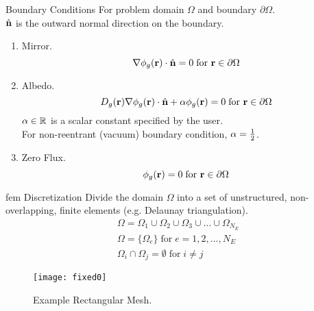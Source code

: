 \begin{frame}{Boundary Conditions}
  For problem domain $\Omega$ and boundary $\partial \Omega$. \\
  $\hat{\mathbf{n}}$ is the outward normal direction on the boundary.
  \begin{enumerate}
    \item Mirror. 
      \begin{equation}
        \mathbf{\nabla} \phi_g(\mathbf{r}) \cdot \hat{\mathbf{n}} = 0 \;  \text{for } 
          \mathbf{r} \in \partial \Omega
      \end{equation}
    \item Albedo. 
      \begin{equation}
        D_g(\mathbf{r}) \mathbf{\nabla} \phi_g(\mathbf{r}) \cdot \hat{\mathbf{n}} + 
          \alpha \phi_g(\mathbf{r})=0 \; \text{for } \mathbf{r} \in \partial \Omega
      \end{equation}
      $\alpha \in \mathbb{R}$ is a scalar constant specified by the user. \\
      For non-reentrant (vacuum) boundary condition, $\alpha = \frac{1}{2}$.
    \item Zero Flux. 
      \begin{equation}
        \phi_g(\mathbf{r}) = 0 \; \text{for } \mathbf{r} \in \partial \Omega
      \end{equation}
  \end{enumerate}
\end{frame}

\begin{frame}{\gls{fem} Discretization}
  Divide the domain $\Omega$ into a set of unstructured, non-overlapping, finite 
  elements (e.g. Delaunay triangulation).
  \begin{gather}
    \label{eq:set_of_elements}
    \Omega = \Omega_1 \cup \Omega_2 \cup \Omega_3 \cup \ldots \cup
      \Omega_{N_E}  \\
    \Omega = \{\Omega_e\} \; \text{for} \; e = 1,2,\ldots,N_E \\
    \Omega_i \cap \Omega_j = \emptyset \; \text{for} \; i \ne j
  \end{gather}
  \begin{figure}
    \centering
    \texttt{[image: fixed0]}
    \caption{Example Rectangular Mesh.}
    \label{fig:fixed0}
  \end{figure}
\end{frame}

